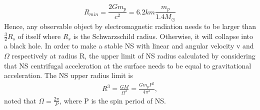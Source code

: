 \documentclass[thesis_msc.tex]{subfiles}
\begin{document}
        \begin{equation} \label{rmin}
    R_{min}= \frac{2Gm_p}{c^2}=6.2km \frac{m_p}{1.4M_\odot}
    \end{equation}
Hence, any observable object by electromagnetic radiation needs to be larger than $\frac{3}{2} R_s$ of itself where $R_s$ is the Schwarzschild radius. Otherwise, it will collapse into a black hole. %
In order to make a stable NS with linear and angular velocity v and $\Omega$  respectively at radius R, the upper limit of NS radius  calculated by considering that NS centrifugal acceleration at the surface needs to be equal to gravitational acceleration. The NS upper radius limit is %
   \begin{eqnarray}
    R^3=\frac{GM}{\Omega^2}=\frac{Gm_pP^2}{4\pi^2}, 
    \end{eqnarray}
    noted that $\Omega=\frac{2\pi}{P}$, where P is the spin period of NS.
    
\end{document}

